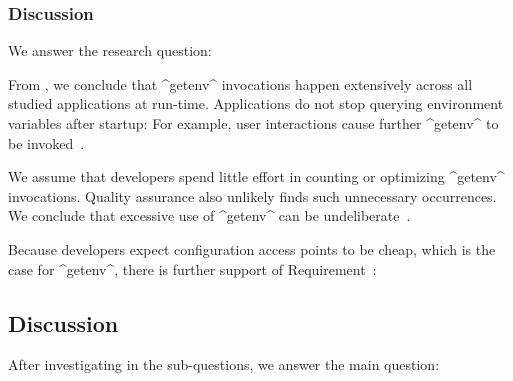 \subsubsection{Discussion}

We answer the research question:
\rqMotivationContextRepeat*

\begin{finding}
From , we conclude that ^getenv^ invocations happen extensively across all studied applications at run-time.
Applications do not stop querying environment variables after startup:
For example, user interactions cause further ^getenv^ to be invoked~\cite{raab2016unanticipated}.
\end{finding}

We assume that developers spend little effort in counting or optimizing ^getenv^ invocations.
Quality assurance also unlikely finds such unnecessary occurrences.
We conclude that excessive use of ^getenv^ can be undeliberate~\cite{raab2016unanticipated}.

Because developers expect configuration access points to be cheap, which is the case for ^getenv^, there is further support of Requirement~:
\reqFast*

\subsection{Discussion}

After investigating in the sub-questions, we answer the main question:
\rqMotivationContext*

